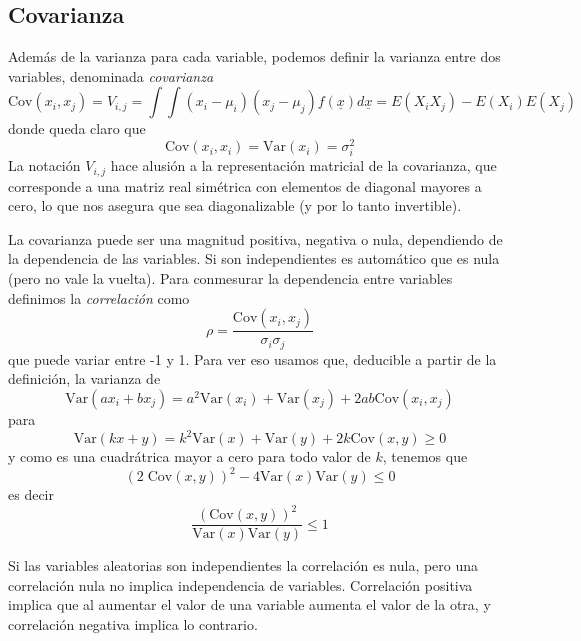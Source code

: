 \documentclass{article}
\numberwithin{equation}{section} %
\begin{document}
\subsection{Covarianza}
Además de la varianza para cada variable, podemos definir la varianza entre dos variables, denominada \emph{covarianza}
\begin{equation}
\text{Cov}(x_i, x_j) = V_{i,j} = \int \int (x_i - \mu_i) (x_j - \mu_j) f(\underline{x}) d\underline{x} = E(X_i X_j) - E(X_i) E(X_j)
\end{equation}
donde queda claro que
\begin{equation}
\text{Cov}(x_i, x_i) = \text{Var}(x_i) = \sigma^2_i
\end{equation}
La notación $V_{i,j}$ hace alusión a la representación matricial de la covarianza, que corresponde a una matriz real simétrica con elementos de diagonal mayores a cero, lo que nos asegura que sea diagonalizable (y por lo tanto invertible). 

La covarianza puede ser una magnitud positiva, negativa o nula, dependiendo de la dependencia de las variables. Si son independientes es automático que es nula (pero no vale la vuelta). Para conmesurar la dependencia entre variables definimos la \emph{correlación} como
\begin{equation}
\rho = \frac{\text{Cov}(x_i, x_j)}{\sigma_i \sigma_j}
\end{equation}
que puede variar entre -1 y 1. Para ver eso usamos que, deducible a partir de la definición, la varianza de
\begin{equation}
\text{Var}(a x_i + b x_j) = a^2 \text{Var}(x_i) + \text{Var}(x_j) + 2 a b \text{Cov}(x_i, x_j)
\end{equation}
para
\[\text{Var}(k x + y) = k^2 \text{Var}(x) + \text{Var}(y) + 2 k \text{Cov}(x,y) \geq 0 \]
y como es una cuadrátrica mayor a cero para todo valor de $k$, tenemos que
\[ (2 \; \text{Cov}(x,y))^2 - 4 \text{Var}(x) \text{Var}(y) \leq 0 \]
es decir
\[ \frac{(\text{Cov}(x,y))^2}{\text{Var}(x) \text{Var}(y)} \leq 1 \]

Si las variables aleatorias son independientes la correlación es nula, pero una correlación nula no implica independencia de variables. Correlación positiva implica que al aumentar el valor de una variable aumenta el valor de la otra, y correlación negativa implica lo contrario.
\end{document}
